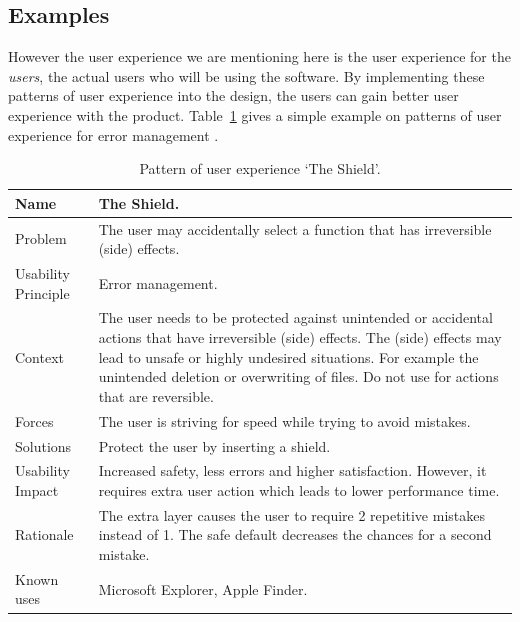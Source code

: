 \documentclass{acm_proc_article-sp}
\begin{document}
\subsection{Examples}
However the user experience we are mentioning here is the user
experience for the \textit{users}, the actual users who will be using
the software. By implementing these patterns of user experience into
the design, the users can gain better user experience with the
product. Table~\ref{tab:shield} gives a simple example on patterns of
user experience for error management \citep{patterns:welie}.

\begin{table}[!t]
  \caption{Pattern of user experience `The Shield'.}
  \label{tab:shield}
  \begin{center}
    \begin{tabular}{| p{} || p{} |}
      \hline
      Name & The Shield. \\ \hline

      Problem & The user may accidentally select a function that has
      irreversible (side) effects. \\ \hline

      Usability Principle & Error management. \\ \hline

      Context & The user needs to be protected against unintended or
      accidental actions that have irreversible (side) effects. The
      (side) effects may lead to unsafe or highly undesired
      situations. For example the unintended deletion or overwriting
      of files. Do not use for actions that are reversible. \\ \hline

      Forces & The user is striving for speed while trying to avoid
      mistakes. \\ \hline

      Solutions & Protect the user by inserting a shield. \\ \hline

      Usability Impact & Increased safety, less errors and higher
      satisfaction. However, it requires extra user action which leads
      to lower performance time. \\ \hline

      Rationale & The extra layer causes the user to require 2
      repetitive mistakes instead of 1. The safe default decreases the
      chances for a second mistake. \\ \hline

      Known uses & Microsoft Explorer, Apple Finder. \\ \hline
    \end{tabular}
  \end{center}
\end{table}
\end{document}
